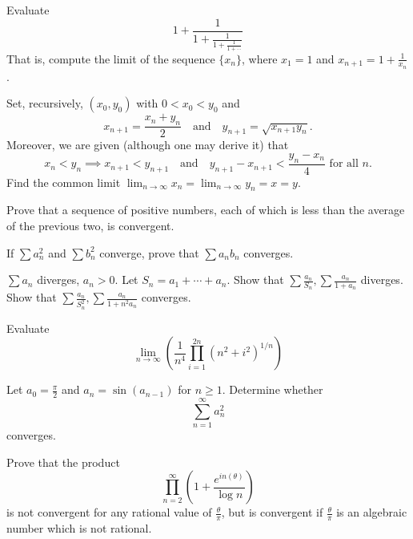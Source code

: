 \documentclass{article}
\begin{document}
        \begin{exercise}
            Evaluate
            \[1+\frac{1}{1+\frac{1}{1+\frac{1}{1+\cdots}}}\]
            That is, compute the limit of the sequence $\{x_n\}$, where $x_1 = 1$ and $x_{n+1}=1+\frac{1}{x_n}$.
        \end{exercise}

\begin{exercise}
            Set, recursively, \((x_0,y_0)\) with \(0<x_0<y_0\) and
            \[x_{n+1}=\frac{x_n+y_n}{2}\quad\textrm{and}\quad y_{n+1}=\sqrt{x_{n+1}y_n}.\]
            Moreover, we are given (although one may derive it) that
            \[x_n<y_n\implies x_{n+1}<y_{n+1}\quad\textrm{and}\quad y_{n+1}-x_{n+1}<\frac{y_n-x_n}{4}\text{ for all }n.\]
            Find the common limit \(\displaystyle\lim_{n\to\infty}x_n=\lim_{n\to\infty}y_n=x=y\).
        \end{exercise}
        
        \begin{exercise}
    Prove that a sequence of positive numbers, each of which is less than the average of the previous two,
is convergent.
\end{exercise}

\begin{exercise}
If $\sum a_{n}^{2}$ and $\sum b_{n}^{2}$ converge, prove that $\sum a_{n}b_{n}$ converges. 
\end{exercise}

\begin{exercise}
$\sum a_{n}$ diverges, $a_{n} > 0$. Let $S_{n} = a_{1} + \cdots + a_{n}$. Show that $\sum \frac{a_{n}}{S_{n}}, \sum \frac{a_{n}}{1 + a_{n}}$ diverges. Show that $\sum \frac{a_{n}}{S_{n}^{2}}, \sum \frac{a_{n}}{1 + n^{2}a_{n}}$ converges. 
\end{exercise} 

\begin{exercise}[1970 B1]
Evaluate \[\lim_{n\to\infty}\left(\frac{1}{n^4} \prod_{i=1}^{2n} (n^2+i^2)^{1/n}\right)\]
\end{exercise}

\begin{exercise}[2020 A3]
Let $a_{0} = \frac{\pi}{2}$ and $a_{n} = \sin(a_{n - 1})$ for $n \geq 1$. Determine whether 
\[\sum_{n = 1}^{\infty} a_{n}^{2}\]
converges. 
\end{exercise}

\begin{exercise}
Prove that the product 
\[ \prod_{n=2}^\infty \left(1 + \frac{e^{in(\theta)}}{\log n}\right)\]
is not convergent for any rational value of $\frac{\theta}{\pi}$, but is convergent if $\frac{\theta}{\pi}$ is an algebraic number which is not rational. 
\end{exercise}
\end{document}
